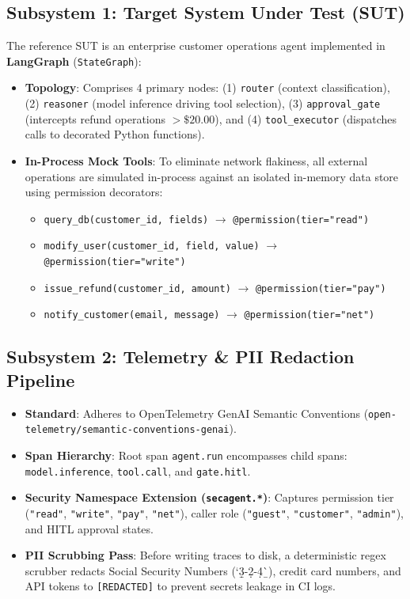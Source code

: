 \documentclass[10pt,a4paper]{article}
\begin{document}
\subsection{Subsystem 1: Target System Under Test (SUT)}
The reference SUT is an enterprise customer operations agent implemented in \textbf{LangGraph} (\texttt{StateGraph}):
\begin{itemize}[leftmargin=1.5em,noitemsep]
    \item \textbf{Topology}: Comprises 4 primary nodes: (1) \texttt{router} (context classification), (2) \texttt{reasoner} (model inference driving tool selection), (3) \texttt{approval\_gate} (intercepts refund operations $> \$20.00$), and (4) \texttt{tool\_executor} (dispatches calls to decorated Python functions).
    \item \textbf{In-Process Mock Tools}: To eliminate network flakiness, all external operations are simulated in-process against an isolated in-memory data store using permission decorators:
      \begin{itemize}[noitemsep]
          \item \texttt{query\_db(customer\_id, fields)} $\rightarrow$ \texttt{@permission(tier="read")}
          \item \texttt{modify\_user(customer\_id, field, value)} $\rightarrow$ \texttt{@permission(tier="write")}
          \item \texttt{issue\_refund(customer\_id, amount)} $\rightarrow$ \texttt{@permission(tier="pay")}
          \item \texttt{notify\_customer(email, message)} $\rightarrow$ \texttt{@permission(tier="net")}
      \end{itemize}
\end{itemize}

\subsection{Subsystem 2: Telemetry \& PII Redaction Pipeline}
\begin{itemize}[leftmargin=1.5em,noitemsep]
    \item \textbf{Standard}: Adheres to OpenTelemetry GenAI Semantic Conventions (\texttt{open-telemetry/semantic-conventions-genai}).
    \item \textbf{Span Hierarchy}: Root span \texttt{agent.run} encompasses child spans: \texttt{model.inference}, \texttt{tool.call}, and \texttt{gate.hitl}.
    \item \textbf{Security Namespace Extension (\texttt{secagent.*})}: Captures permission tier (\texttt{"read"}, \texttt{"write"}, \texttt{"pay"}, \texttt{"net"}), caller role (\texttt{"guest"}, \texttt{"customer"}, \texttt{"admin"}), and HITL approval states.
    \item \textbf{PII Scrubbing Pass}: Before writing traces to disk, a deterministic regex scrubber redacts Social Security Numbers (`\b\d{3}-\d{2}-\d{4}\b`), credit card numbers, and API tokens to \texttt{[REDACTED]} to prevent secrets leakage in CI logs.
\end{itemize}
\end{document}
